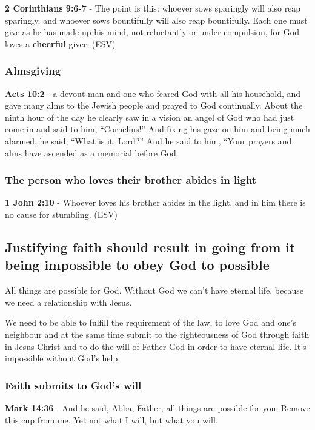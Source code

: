 \documentclass[11pt]{article}
\begin{document}
\textbf{2 Corinthians 9:6-7} - The point is this: whoever sows sparingly will also reap sparingly, and whoever sows bountifully will also reap bountifully.  Each one must give as he has made up his mind, not reluctantly or under compulsion, for God loves a \textbf{cheerful} giver.  (ESV)

\subsubsection{Almsgiving}
\label{sec:orgda04e39}
\textbf{Acts 10:2} - a devout man and one who feared God with all his household, and gave many alms to the Jewish people and prayed to God continually.  About the ninth hour of the day he clearly saw in a vision an angel of God who had just come in and said to him, “Cornelius!” And fixing his gaze on him and being much alarmed, he said, “What is it, Lord?” And he said to him, “Your prayers and alms have ascended as a memorial before God.

\subsubsection{The person who loves their brother abides in light}
\label{sec:orgcbf7e08}
\textbf{1 John 2:10} - Whoever loves his brother abides in the light, and in him there is no cause for stumbling.  (ESV)

\subsection{Justifying faith should result in going from it being impossible to obey God to possible}
\label{sec:orgdef04e0}
All things are possible for God.
Without God we can't have eternal life, because we need a relationship with Jesus.

We need to be able to fulfill the requirement
of the law, to love God and one's neighbour and at the same time
submit to the righteousness of God through faith in Jesus
Christ and to do the will of Father God in
order to have eternal life. It's impossible without God's help.

\subsubsection{Faith submits to God's will}
\label{sec:org8fbfae4}
\textbf{Mark 14:36} - And he said, Abba, Father, all things are possible for you. Remove this cup from me. Yet not what I will, but what you will.
\end{document}
